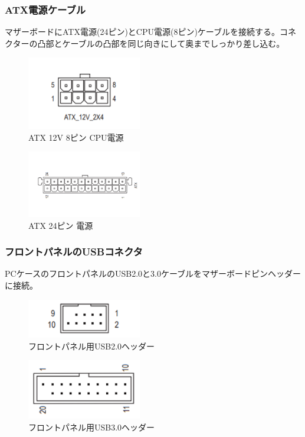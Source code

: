 \documentclass[10pt]{article}
\begin{document}
\subsubsection{ATX電源ケーブル}
\hspace{1cm}マザーボードにATX電源(24ピン)とCPU電源(8ピン)ケーブルを接続する。コネクターの凸部とケーブルの凸部を同じ向きにして奥までしっかり差し込む。

\begin{figure}[H]
	\centering
	\includegraphics[width=5cm]{6PIN.png}
	\caption{ATX 12V 8ピン CPU電源}
\end{figure}

\begin{figure}[H]
	\centering
	\includegraphics[width=5cm]{24PIN.png}
	\caption{ATX 24ピン 電源}
\end{figure}

\subsubsection{フロントパネルのUSBコネクタ}
\hspace{1cm}PCケースのフロントパネルのUSB2.0と3.0ケーブルをマザーボードピンヘッダーに接続。

\begin{figure}[H]
	\centering
	\includegraphics[width=5cm]{USB2}
	\caption{フロントパネル用USB2.0ヘッダー}
\end{figure}
\begin{figure}[H]
	\centering
	\includegraphics[width=5cm]{USB3}
	\caption{フロントパネル用USB3.0ヘッダー}
\end{figure}
\end{document}
